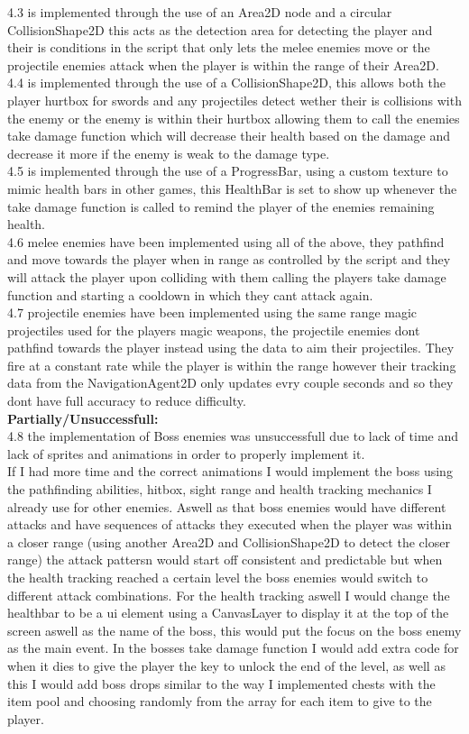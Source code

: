 \documentclass{article}
\begin{document}
        4.3 is implemented through the use of an Area2D node and a circular CollisionShape2D this acts as the detection area for detecting the player and their is conditions in the script that only lets the melee enemies move or the projectile enemies attack when the player is within the range of their Area2D.\\
        4.4 is implemented through the use of a CollisionShape2D, this allows both the player hurtbox for swords and any projectiles detect wether their is collisions with the enemy or the enemy is within their hurtbox allowing them to call the enemies take damage function which will decrease their health based on the damage and decrease it more if the enemy is weak to the damage type.\\
        4.5 is implemented through the use of a ProgressBar, using a custom texture to mimic health bars in other games, this HealthBar is set to show up whenever the take damage function is called to remind the player of the enemies remaining health.\\
        4.6 melee enemies have been implemented using all of the above, they pathfind and move towards the player when in range as controlled by the script and they will attack the player upon colliding with them calling the players take damage function and starting a cooldown in which they cant attack again.\\
        4.7 projectile enemies have been implemented using the same range magic projectiles used for the players magic weapons, the projectile enemies dont pathfind towards the player instead using the data to aim their projectiles. They fire at a constant rate while the player is within the range however their tracking data from the NavigationAgent2D only updates evry couple seconds and so they dont have full accuracy to reduce difficulty.\\
        \textbf{Partially/Unsuccessfull:}\\
        4.8 the implementation of Boss enemies was unsuccessfull due to lack of time and lack of sprites and animations in order to properly implement it.\\
        If I had more time and the correct animations I would implement the boss using the pathfinding abilities, hitbox, sight range and health tracking mechanics I already use for other enemies. Aswell as that boss enemies would have different attacks and have sequences of attacks they executed when the player was within a closer range (using another Area2D and CollisionShape2D to detect the closer range) the attack pattersn would start off consistent and predictable but when the health tracking reached a certain level the boss enemies would switch to different attack combinations. For the health tracking aswell I would change the healthbar to be a ui element using a CanvasLayer to display it at the top of the screen aswell as the name of the boss, this would put the focus on the boss enemy as the main event. In the bosses take damage function I would add extra code for when it dies to give the player the key to unlock the end of the level, as well as this I would add boss drops similar to the way I implemented chests with the item pool and choosing randomly from the array for each item to give to the player.\\
\end{document}
